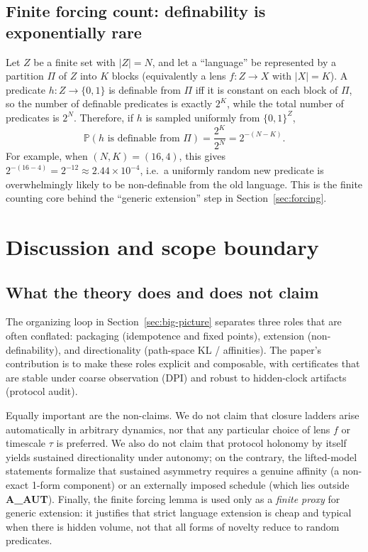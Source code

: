 \documentclass[11pt]{article}
\theoremstyle{remark}
\begin{document}
\subsection{Finite forcing count: definability is exponentially rare}
\label{subsec:ex:forcing-count}

Let $Z$ be a finite set with $|Z|=N$, and let a “language” be represented by a partition $\Pi$ of $Z$
into $K$ blocks (equivalently a lens $f:Z\to X$ with $|X|=K$). A predicate $h:Z\to\{0,1\}$ is definable
from $\Pi$ iff it is constant on each block of $\Pi$, so the number of definable predicates is exactly $2^K$,
while the total number of predicates is $2^N$. Therefore, if $h$ is sampled uniformly from $\{0,1\}^Z$,
\[
\mathbb P(h\text{ is definable from }\Pi)=\frac{2^K}{2^N}=2^{-(N-K)}.
\]
For example, when $(N,K)=(16,4)$, this gives $2^{-(16-4)}=2^{-12}\approx 2.44\times 10^{-4}$, i.e.\
a uniformly random new predicate is overwhelmingly likely to be non-definable from the old language.
This is the finite counting core behind the “generic extension” step in Section~\ref{sec:forcing}.

\section{Discussion and scope boundary}
\subsection{What the theory does and does not claim}\label{sec:discussion-claims}

The organizing loop in Section~\ref{sec:big-picture} separates three roles that are often conflated:
packaging (idempotence and fixed points), extension (non-definability), and directionality (path-space KL / affinities).
The paper’s contribution is to make these roles explicit and composable, with certificates that are stable under coarse observation (DPI) and robust to hidden-clock artifacts (protocol audit).

Equally important are the non-claims.
We do not claim that closure ladders arise automatically in arbitrary dynamics, nor that any particular choice of lens $f$ or timescale $\tau$ is preferred.
We also do not claim that protocol holonomy by itself yields sustained directionality under autonomy; on the contrary, the lifted-model statements formalize that sustained asymmetry requires a genuine affinity (a non-exact 1-form component) or an externally imposed schedule (which lies outside \textbf{A\_AUT}).
Finally, the finite forcing lemma is used only as a \emph{finite proxy} for generic extension: it justifies that strict language extension is cheap and typical when there is hidden volume, not that all forms of novelty reduce to random predicates.
\end{document}
